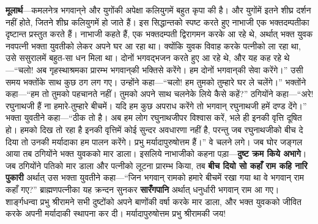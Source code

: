\begin{sloppypar}\justifying{}
\textbf{मूलार्थ}—कमलनेत्र भगवान्‌ने और युगोंकी अपेक्षा कलियुगमें बहुत कृपा की है। और युगोंमें इतने शीघ्र दर्शन नहीं होते, जितने शीघ्र कलियुगमें हो जाते हैं। इस सिद्धान्तको स्पष्ट करते हुए नाभाजी एक भक्त\-दम्पतीका दृष्टान्त प्रस्तुत करते हैं। नाभाजी कहते हैं, एक भक्त\-दम्पती द्विरागमन करके आ रहे थे, अर्थात् भक्त युवक नवपत्नी भक्ता युवतीको लेकर अपने घर आ रहा था। क्योंकि युवक विवाह करके पत्नीको ला रहा था, उसे ससुरालमें बहुत-सा धन मिला था। दोनों भगवद्भजन करते हुए आ रहे थे, और यह कह रहे थे—“चलो! अब गृहस्थाश्रमका प्रारम्भ भगवान्‌की भक्तिसे करेंगे। हम दोनों भगवान्‌की सेवा करेंगे।” उसी समय भक्तोंके साथ कुछ ठग लग गए। उन्होंने कहा—“चलो! हम तुमको तुम्हारे घर ले चलेंगे।” भक्तोंने कहा—“हम तो तुमको पहचानते नहीं। तुमको अपने साथ चलनेके लिये कैसे कहें?” ठगियोंने कहा—“अरे! रघुनाथजी हैं ना हमारे-तुम्हारे बीचमें। यदि हम कुछ अपराध करेंगे तो भगवान् रघुनाथजी हमें दण्ड देंगे।” भक्ता युवतीने कहा—“ठीक तो है। अब हम लोग रघुनाथजीपर विश्वास करें, भले ही इनकी वृत्ति दूषित हो। हमको दिख तो रहा है इनकी वृत्तिमें कोई सुन्दर अवधारणा नहीं है, परन्तु जब रघुनाथजीको बीच दे दिया तो उनकी मर्यादाका हम पालन करेंगे। प्रभु मर्यादा\-पुरुषोत्तम हैं।” वे चलने लगे। जब घोर जङ्गल आया तब ठगियोंने भक्त युवकको मार डाला। इसलिये नाभाजीको कहना पड़ा—\textbf{दुष्ट क्रम किये अभागे}। जब ठगियोंने पतिको मार डाला और पत्नीको लूटना प्रारम्भ किया, तब \textbf{बीच दियो सो कहाँ राम कहि नारि पुकारी} अर्थात् उस भक्ता युवतीने कहा—“जिन भगवान् रामको हमारे बीचमें रखा गया था वे भगवान् राम कहाँ गए?” ब्राह्मण\-पत्नीका यह क्रन्दन सुनकर \textbf{सारँगपानि} अर्थात् धनुर्धारी भगवान् राम आ गए। शार्ङ्गधन्वा प्रभु श्रीरामने सभी दुष्टोंको अपने बाणोंकी वर्षा करके मार डाला, और भक्त युवकको जीवित करके अपनी मर्यादाकी स्थापना कर दी। मर्यादा\-पुरुषोत्तम प्रभु श्रीरामकी जय!
\end{sloppypar}


